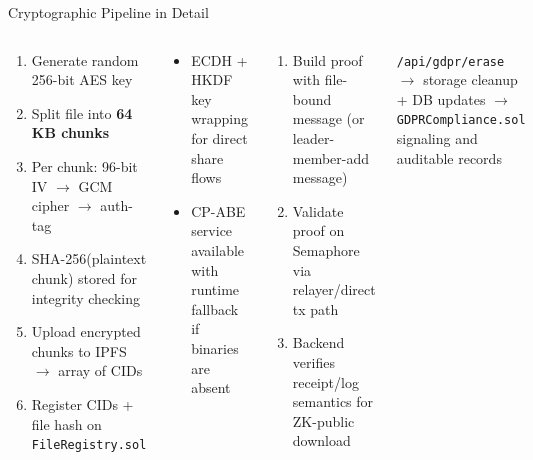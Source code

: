 \documentclass[aspectratio=169]{beamer}
\begin{document}
\begin{frame}{Cryptographic Pipeline in Detail}
\begin{columns}[t]
\begin{tcolorbox}[bluebox, title=\textbf{File Encryption (AES-256-GCM)}]
\tiny
\begin{enumerate}
  \item Generate random 256-bit AES key
  \item Split file into \textbf{64\,KB chunks}
  \item Per chunk: 96-bit IV $\to$ GCM cipher $\to$ auth-tag
  \item SHA-256(plaintext chunk) stored for integrity checking
  \item Upload encrypted chunks to IPFS $\to$ array of CIDs
  \item Register CIDs + file hash on \texttt{FileRegistry.sol}
\end{enumerate}
\end{tcolorbox}
\vspace{0.12cm}
\begin{tcolorbox}[navybox, title=\textbf{Key Share / Wrap Paths}]
\tiny
\begin{itemize}
  \item ECDH + HKDF key wrapping for direct share flows
  \item CP-ABE service available with runtime fallback if binaries are absent
\end{itemize}
\end{tcolorbox}
\begin{tcolorbox}[bluebox, title=\textbf{Semaphore-based ZK Access Flow}]
\scriptsize
\begin{enumerate}
  \item Build proof with file-bound message (or leader-member-add message)
  \item Validate proof on Semaphore via relayer/direct tx path
  \item Backend verifies receipt/log semantics for ZK-public download
\end{enumerate}
\end{tcolorbox}
\vspace{0.12cm}
\begin{tcolorbox}[greenbox, title=\textbf{GDPR Erasure Pipeline}]
\scriptsize
\texttt{/api/gdpr/erase} $\to$ storage cleanup + DB updates $\to$
\texttt{GDPRCompliance.sol} signaling and auditable records
\end{tcolorbox}
\end{columns}
\end{frame}
\end{document}
